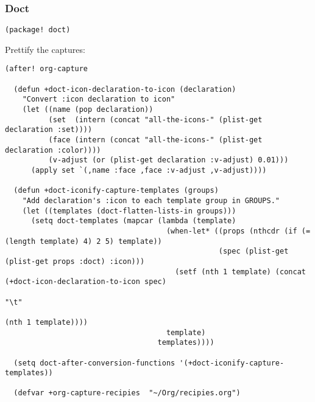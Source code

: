 \documentclass[c]{article}
\theoremstyle{plain}%
\theoremstyle{definition}
\theoremstyle{remark}
\begin{document}
\subsubsection{Doct}
\label{sec:org64f9b23}
\begin{verbatim}
(package! doct)
\end{verbatim}
Prettify the captures:
\begin{verbatim}
(after! org-capture

  (defun +doct-icon-declaration-to-icon (declaration)
    "Convert :icon declaration to icon"
    (let ((name (pop declaration))
          (set  (intern (concat "all-the-icons-" (plist-get declaration :set))))
          (face (intern (concat "all-the-icons-" (plist-get declaration :color))))
          (v-adjust (or (plist-get declaration :v-adjust) 0.01)))
      (apply set `(,name :face ,face :v-adjust ,v-adjust))))

  (defun +doct-iconify-capture-templates (groups)
    "Add declaration's :icon to each template group in GROUPS."
    (let ((templates (doct-flatten-lists-in groups)))
      (setq doct-templates (mapcar (lambda (template)
                                     (when-let* ((props (nthcdr (if (= (length template) 4) 2 5) template))
                                                 (spec (plist-get (plist-get props :doct) :icon)))
                                       (setf (nth 1 template) (concat (+doct-icon-declaration-to-icon spec)
                                                                      "\t"
                                                                      (nth 1 template))))
                                     template)
                                   templates))))

  (setq doct-after-conversion-functions '(+doct-iconify-capture-templates))

  (defvar +org-capture-recipies  "~/Org/recipies.org")


\end{verbatim}
\end{document}
